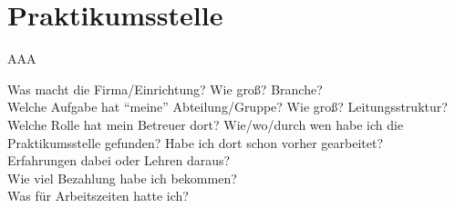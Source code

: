 \section{Praktikumsstelle}



AAA~\cite{unternehmensstruktur}









Was macht die Firma/Einrichtung? Wie groß? Branche?\\
Welche Aufgabe hat "`meine"' Abteilung/Gruppe? Wie groß? Leitungsstruktur?\\
Welche Rolle hat mein Betreuer dort?
Wie/wo/durch wen habe ich die Praktikumsstelle gefunden? Habe ich dort schon vorher gearbeitet?\\
Erfahrungen dabei oder Lehren daraus?\\
Wie viel Bezahlung habe ich bekommen?\\
Was für Arbeitszeiten hatte ich?\\
